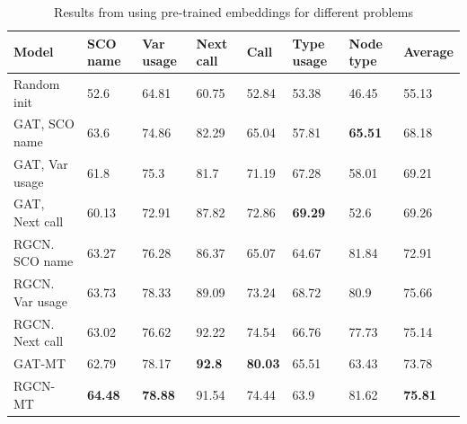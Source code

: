 \documentclass[a4paper,twoside]{article}
\begin{document}
\begin{table}[]
\centering
\caption{Results from using pre-trained embeddings for different problems}
\label{tbl:transfer_results}
\begin{tabular}{llllllll} \toprule
\textbf{Model}  & \textbf{SCO name} & \textbf{Var usage} & \textbf{Next call} & \textbf{Call}  & \textbf{Type usage} & \textbf{Node type} & \textbf{Average} \\ \midrule
Random init     & 52.6              & 64.81              & 60.75              & 52.84          & 53.38               & 46.45              & 55.13            \\ \midrule
GAT, SCO name   & 63.6              & 74.86              & 82.29              & 65.04          & 57.81               & \textbf{65.51}     & 68.18            \\ \midrule
GAT, Var usage  & 61.8              & 75.3               & 81.7               & 71.19          & 67.28               & 58.01              & 69.21            \\ \midrule
GAT, Next call  & 60.13             & 72.91              & 87.82              & 72.86          & \textbf{69.29}      & 52.6               & 69.26            \\ \midrule
RGCN. SCO name  & 63.27             & 76.28              & 86.37              & 65.07          & 64.67               & 81.84              & 72.91            \\ \midrule
RGCN. Var usage & 63.73             & 78.33              & 89.09              & 73.24          & 68.72               & 80.9               & 75.66            \\ \midrule
RGCN. Next call & 63.02             & 76.62              & 92.22              & 74.54          & 66.76               & 77.73              & 75.14            \\ \midrule
GAT-MT          & 62.79             & 78.17              & \textbf{92.8}      & \textbf{80.03} & 65.51               & 63.43              & 73.78            \\ \midrule
RGCN-MT         & \textbf{64.48}    & \textbf{78.88}     & 91.54              & 74.44          & 63.9                & 81.62              & \textbf{75.81}  \\ \bottomrule
\end{tabular}
\end{table}

\end{document}
